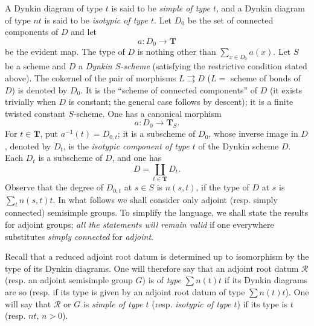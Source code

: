 A Dynkin diagram of type $t$ is said to be \emph{simple of type $t$}, and a Dynkin diagram of type $nt$ is said to be \emph{isotypic of type $t$}. Let $D_0$ be the set of connected components of $D$ and let
\[
a:D_0\to\mathbf T
\]
be the evident map. The type of $D$ is nothing other than $\sum_{x\in D_0}a(x)$.
\label{XXIV.5.2}
Let $S$ be a scheme and $D$ a \emph{Dynkin $S$-scheme} (satisfying the restrictive condition stated above). The cokernel of the pair of morphisms $L\rightrightarrows D$ ($L=$ scheme of bonds of $D$) is denoted by $D_0$. It is the ``scheme of connected components'' of $D$ (it exists trivially when $D$ is constant; the general case follows by descent); it is a finite twisted constant $S$-scheme.
One has a canonical morphism
\[
a:D_0\to\mathbf T_S.
\]
For $t\in\mathbf T$, put $a^{-1}(t)=D_{0,t}$; it is a subscheme of $D_0$, whose inverse image in $D$, denoted by $D_t$, is the \emph{isotypic component of type $t$} of the Dynkin scheme $D$. Each $D_t$ is a subscheme of $D$, and one has
\[
D=\coprod_{t\in\mathbf T}D_t.
\]
Observe that the degree of $D_{0,t}$ at $s\in S$ is $n(s,t)$, if the type of $D$ at $s$ is $\sum_t n(s,t)t$.
\label{XXIV.5.3}
In what follows we shall consider only adjoint (resp. simply connected) semisimple groups. To simplify the language, we shall state the results for adjoint groups; \emph{all the statements will remain valid} if one everywhere substitutes \emph{simply connected} for \emph{adjoint}.

Recall that a reduced adjoint root datum is determined up to isomorphism by the type of its Dynkin diagrams. One will therefore say that an adjoint root datum $\mathscr R$ (resp. an adjoint semisimple group $G$) is of \emph{type} $\sum n(t)t$ if its Dynkin diagrams are so (resp. if its type is given by an adjoint root datum of type $\sum n(t)t$). One will say that $\mathscr R$ or $G$ is \emph{simple of type $t$} (resp. \emph{isotypic of type $t$}) if its type is $t$ (resp. $nt$, $n>0$).

